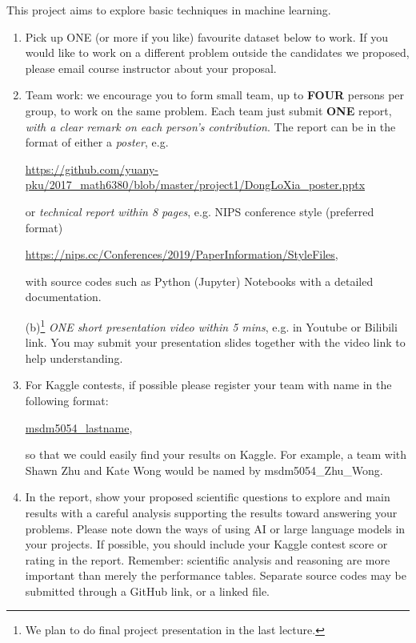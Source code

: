 \documentclass[11pt]{article}
\begin{document}
This project aims to explore basic techniques in machine learning.
\begin{enumerate}
\item Pick up ONE (or more if you like) favourite dataset below to work. If you would like to work on a different problem outside the candidates we proposed, please email course instructor about your proposal.  
\item Team work: we encourage you to form small team, up to {\bf FOUR} persons per group, to work on the same problem. Each team just submit {\bf ONE} report, \emph{with a clear remark on each person's contribution}. The report can be in the format of either a \emph{poster}, e.g. 
\begin{center}%
\url{https://github.com/yuany-pku/2017_math6380/blob/master/project1/DongLoXia_poster.pptx}
\end{center}
or \emph{technical report within 8 pages}, e.g. NIPS conference style (preferred format) 
\begin{center}
\url{https://nips.cc/Conferences/2019/PaperInformation/StyleFiles}, 
\end{center}
with source codes such as Python (Jupyter) Notebooks with a detailed documentation.

\subitem*(b)\footnote{We plan to do final project presentation in the last lecture.} \emph{ONE short presentation video within 5 mins}, e.g. in Youtube or Bilibili link. You may submit your presentation slides together with the video link to help understanding. 

\item For Kaggle contests, if possible please register your team with name in the following format: \begin{center}{\url{msdm5054\_lastname}},\end{center} so that we could easily find your results on Kaggle. For example, a team with Shawn Zhu and Kate Wong would be named by msdm5054\_Zhu\_Wong.

\item In the report, show your proposed scientific questions to explore and main results with a careful analysis supporting the results toward answering your problems. Please note down the ways of using AI or large language models in your projects. If possible, you should include your Kaggle contest score or rating in the report. Remember: scientific analysis and reasoning are more important than merely the performance tables. Separate source codes may be submitted through a GitHub link, or a linked file.    


\end{enumerate}
\end{document}
